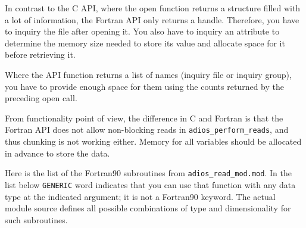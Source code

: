In contrast to the C API, where the open function returns a structure filled with 
a lot of information, the Fortran API only returns a handle. Therefore, 
you have to inquiry the file after opening it.
You also have to inquiry an attribute to determine the memory 
size needed to store its value and allocate space for it before retrieving it. 

Where the API function returns a list of names (inquiry file or inquiry group), 
you have to provide enough space for them using the counts returned by the preceding 
open call. 

From functionality point of view, the difference in C and Fortran is that the 
Fortran API does not allow non-blocking reads in \verb+adios_perform_reads+, and thus
chunking is not working either. Memory for all variables should be allocated in advance 
to store the data.

Here is the list of the Fortran90 subroutines from \verb+adios_read_mod.mod+. 
In the list below \verb+GENERIC+ word indicates that you 
can use that function with any data type at the indicated argument; it is not
a Fortran90 keyword. The actual module source defines all possible combinations 
of type and dimensionality for such subroutines. 

